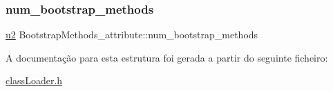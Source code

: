 \subsubsection{\texorpdfstring{num\+\_\+bootstrap\+\_\+methods}{num\_bootstrap\_methods}}
{\footnotesize\ttfamily \hyperlink{util_8h_a55ef8d87fd202b8417704c089899c5b9}{u2} Bootstrap\+Methods\+\_\+attribute\+::num\+\_\+bootstrap\+\_\+methods}



A documentação para esta estrutura foi gerada a partir do seguinte ficheiro\+:\begin{DoxyCompactItemize}
\item 
\hyperlink{class_loader_8h}{class\+Loader.\+h}\end{DoxyCompactItemize}
